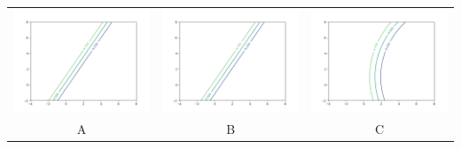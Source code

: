 \documentclass{article}
\begin{document}
\begin{center}
\begin{tabular}{ccc}
\includegraphics[scale=0.25]{y_posterior} &
\includegraphics[scale=0.25]{z_posterior} &
\includegraphics[scale=0.25]{w_posterior} \\
\scriptsize A & 
\scriptsize B &
\scriptsize C
\end{tabular}
\end{center}
\end{document}
